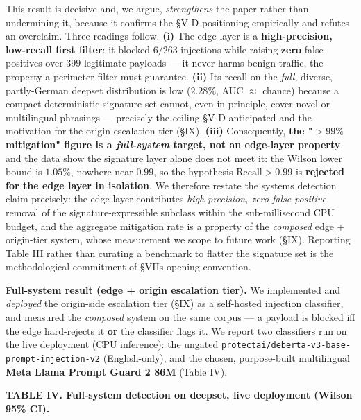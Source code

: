 This result is decisive and, we argue, \emph{strengthens} the paper
rather than undermining it, because it confirms the §V-D positioning
empirically and refutes an overclaim. Three readings follow.
\textbf{(i)} The edge layer is a \textbf{high-precision, low-recall
first filter}: it blocked \(6/263\) injections while raising
\textbf{zero} false positives over \(399\) legitimate payloads --- it
never harms benign traffic, the property a perimeter filter must
guarantee. \textbf{(ii)} Its recall on the \emph{full}, diverse,
partly-German deepset distribution is low (\(2.28\%\), AUC \(\approx\)
chance) because a compact deterministic signature set cannot, even in
principle, cover novel or multilingual phrasings --- precisely the
ceiling §V-D anticipated and the motivation for the origin escalation
tier (§IX). \textbf{(iii)} Consequently, \textbf{the "\(>99\%\)
mitigation" figure is a \emph{full-system} target, not an edge-layer
property}, and the data show the signature layer alone does not meet it:
the Wilson lower bound is \(1.05\%\), nowhere near \(0.99\), so the
hypothesis \(\text{Recall}>0.99\) is \textbf{rejected for the edge layer
in isolation}. We therefore restate the system\textquotesingle s
detection claim precisely: the edge layer contributes
\emph{high-precision, zero-false-positive} removal of the
signature-expressible subclass within the sub-millisecond CPU budget,
and the aggregate mitigation rate is a property of the \emph{composed}
edge + origin-tier system, whose measurement we scope to future work
(§IX). Reporting Table III rather than curating a benchmark to flatter
the signature set is the methodological commitment of
§VII\textquotesingle s opening convention.

\textbf{Full-system result (edge + origin escalation tier).} We
implemented and \emph{deployed} the origin-side escalation tier (§IX) as
a self-hosted injection classifier, and measured the \emph{composed}
system on the same corpus --- a payload is blocked iff the edge
hard-rejects it \textbf{or} the classifier flags it. We report two
classifiers run on the live deployment (CPU inference): the ungated
\passthrough{\lstinline!protectai/deberta-v3-base-prompt-injection-v2!}
(English-only), and the chosen, purpose-built multilingual \textbf{Meta
Llama Prompt Guard 2 86M} (Table IV).

\textbf{TABLE IV. Full-system detection on deepset, live deployment
(Wilson 95\% CI).}


